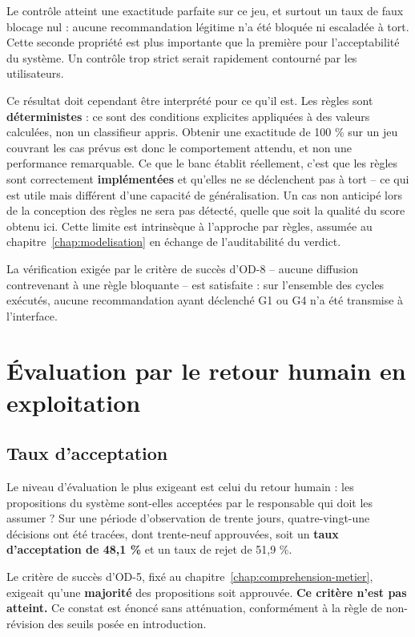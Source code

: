 Le contrôle atteint une exactitude parfaite sur ce jeu, et surtout un taux de faux blocage nul : aucune recommandation légitime n'a été bloquée ni escaladée à tort. Cette seconde propriété est plus importante que la première pour l'acceptabilité du système. Un contrôle trop strict serait rapidement contourné par les utilisateurs.

Ce résultat doit cependant être interprété pour ce qu'il est. Les règles sont \textbf{déterministes} : ce sont des conditions explicites appliquées à des valeurs calculées, non un classifieur appris. Obtenir une exactitude de 100 \% sur un jeu couvrant les cas prévus est donc le comportement attendu, et non une performance remarquable. Ce que le banc établit réellement, c'est que les règles sont correctement \textbf{implémentées} et qu'elles ne se déclenchent pas à tort -- ce qui est utile mais différent d'une capacité de généralisation. Un cas non anticipé lors de la conception des règles ne sera pas détecté, quelle que soit la qualité du score obtenu ici. Cette limite est intrinsèque à l'approche par règles, assumée au chapitre~\ref{chap:modelisation} en échange de l'auditabilité du verdict.

La vérification exigée par le critère de succès d'OD-8 -- aucune diffusion contrevenant à une règle bloquante -- est satisfaite : sur l'ensemble des cycles exécutés, aucune recommandation ayant déclenché G1 ou G4 n'a été transmise à l'interface.

\section{Évaluation par le retour humain en exploitation}
\label{sec:eval-humain}

\subsection{Taux d'acceptation}

Le niveau d'évaluation le plus exigeant est celui du retour humain : les propositions du système sont-elles acceptées par le responsable qui doit les assumer ? Sur une période d'observation de trente jours, quatre-vingt-une décisions ont été tracées, dont trente-neuf approuvées, soit un \textbf{taux d'acceptation de 48,1 \%} et un taux de rejet de 51,9 \%.

Le critère de succès d'OD-5, fixé au chapitre~\ref{chap:comprehension-metier}, exigeait qu'une \textbf{majorité} des propositions soit approuvée. \textbf{Ce critère n'est pas atteint.} Ce constat est énoncé sans atténuation, conformément à la règle de non-révision des seuils posée en introduction.

